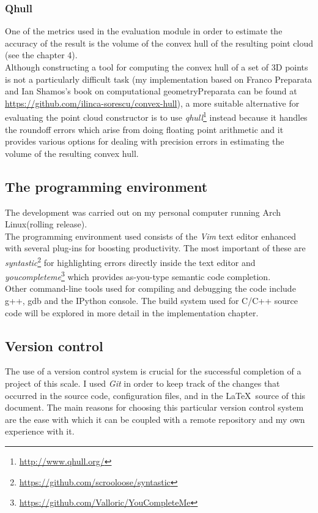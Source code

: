 \documentclass[12pt,a4paper,twoside,openright]{report}
\begin{document}
\subsubsection{Qhull}
One of the metrics used in the evaluation module in order to estimate the accuracy of the result is the volume of the convex hull of the resulting point cloud (see the chapter 4).\\
Although constructing a tool for computing the convex hull of a set of 3D points is not a particularly difficult task (my implementation based on Franco Preparata and Ian Shamos's book on computational geometry{Preparata} can be found at \url{https://github.com/ilinca-sorescu/convex-hull}), a more suitable alternative for evaluating the point cloud constructor is to use \emph{qhull}\footnote{\url{http://www.qhull.org/}} instead because it handles the roundoff errors which arise from doing floating point arithmetic and it provides various options for dealing with precision errors in estimating the volume of the resulting convex hull. 

\subsection{The programming environment}
The development was carried out on my personal computer running Arch Linux(rolling release).\\
The programming environment used consists of the \textit{Vim} text editor enhanced with several plug-ins for boosting productivity. The most important of these are \textit{syntastic}\footnote{\url{https://github.com/scrooloose/syntastic}} for highlighting errors directly inside the text editor and \textit{youcompleteme}\footnote{\url{https://github.com/Valloric/YouCompleteMe}} which provides as-you-type semantic code completion.\\
Other command-line tools used for compiling and debugging the code include g++, gdb and the IPython console. The build system used for C/C++ source code will be explored in more detail in the implementation chapter.

\subsection{Version control}
The use of a version control system is crucial for the successful completion of a project of this scale. I used \emph{Git} in order to keep track of the changes that occurred in the source code, configuration files, and in the \LaTeX\  source of this document. The main reasons for choosing this particular version control system are the ease with which it can be coupled with a remote repository and my own experience with it.
\end{document}

